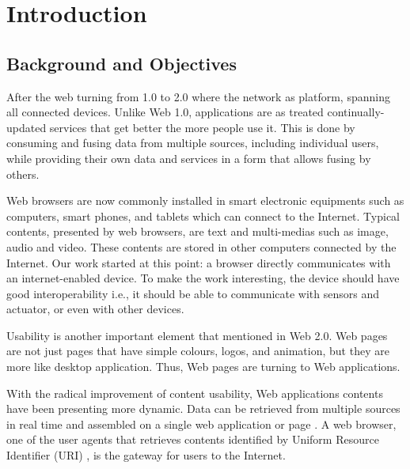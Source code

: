 \chapter{Introduction}
\label{chapter:intro}

\section{Background and Objectives}
After the web turning from 1.0 to 2.0 where the network as platform, spanning all connected devices. Unlike Web 1.0, applications are as treated continually-updated services that get better the more people use it. This is done by consuming and fusing data from multiple sources, including individual users, while providing their own data and services in a form that allows fusing by others\cite{o2005web}.

Web browsers are now commonly installed in smart electronic equipments such as computers, smart phones, and tablets which can connect to the Internet. Typical contents, presented by web browsers, are text and multi-medias such as image, audio and video. These contents are stored in other computers connected by the Internet. Our work started at this point: a browser directly communicates with an internet-enabled device. To make the work interesting, the device should have good interoperability i.e., it should be able to communicate with sensors and actuator, or even with other devices.

Usability is another important element that mentioned in Web 2.0. Web pages are not just pages that have simple colours, logos, and animation, but they are more like desktop application. Thus, Web pages are turning to Web applications\cite{Lewis:2006:WEB:1217666.1217669}.

With the radical improvement of content usability, Web applications contents have been presenting more dynamic. Data can be retrieved from multiple sources in real time and assembled on a single web application or page \cite{Lewis:2006:WEB:1217666.1217669}. A web browser, one of the user agents that retrieves contents identified by Uniform Resource Identifier (URI) \cite{ArchitectWorldWideWebVolumeOne}, is the gateway for users to the Internet.


